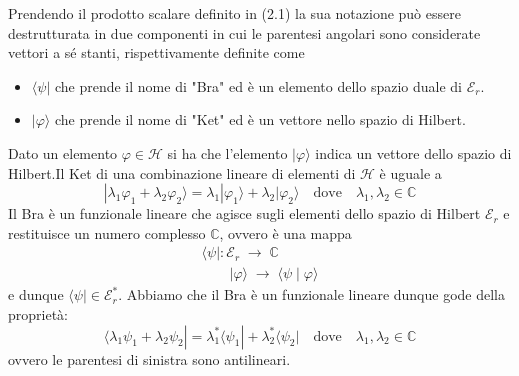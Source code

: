 Prendendo il prodotto scalare definito in (2.1) la sua notazione pu\`o essere destrutturata in due componenti in cui le parentesi angolari sono considerate vettori a s\'e stanti, rispettivamente definite come 
\begin{itemize}
	\item $\langle \psi |$ che prende il nome di "Bra" ed \`e un elemento dello spazio duale di $\mathcal{E}_r$.
	\item $| \varphi \rangle $ che prende il nome di "Ket" ed \`e un vettore nello spazio di Hilbert.
\end{itemize} 
 Dato un elemento $\varphi \in \mathcal{H}$ si ha che l'elemento $|\varphi \rangle$ indica un vettore dello spazio di Hilbert.Il Ket di una combinazione lineare di elementi di $\mathcal{H}$ \`e uguale a 
\begin{equation*}
	|\lambda_1 \varphi_1 + \lambda_2 \varphi_2\rangle = \lambda_1 | \varphi_1 \rangle + \lambda_2 | \varphi_2 \rangle \quad \text{dove} \quad  \lambda_1,\lambda_2 \in \mathbb{C}
\end{equation*}
\noindent Il Bra \`e un funzionale lineare che agisce sugli elementi dello spazio di Hilbert $\mathcal{E}_r$ e restituisce un numero complesso $\mathbb{C}$, ovvero \`e una mappa
\begin{equation*}
\begin{array}{l}
	\langle \psi| : \mathcal{E}_r \; \to \; \mathbb{C}\\
	\quad \quad |\varphi \rangle \; \to \; \langle \psi \; | \; \varphi \rangle
\end{array}
\end{equation*}
e dunque $\langle \psi | \in \mathcal{E}_r^*$. Abbiamo che il Bra \`e un funzionale lineare dunque gode della propriet\`a:
\begin{equation*}
	\langle \lambda_1 \psi_1 + \lambda_2 \psi_2| = \lambda_1^*\langle \psi_1| + \lambda_2^* \langle \psi_2| \quad \text{dove} \quad \lambda_1,\lambda_2 \in \mathbb{C}
\end{equation*}
ovvero le parentesi di sinistra sono antilineari.
\newline

